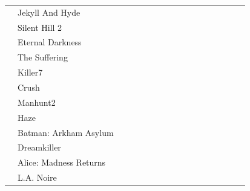 \documentclass[twoside]{urjc-tfg}
\begin{document}
\begin{landscape}
\begin{longtable}{l  l  *{15}{c} }
                      & Jekyll And Hyde		     &      &      &        &       &                      &                   &                   &                   &                   \\
                      & Silent Hill 2		     &      &      &        &       &                      &                   &                   &                   &                   \\
                      & Eternal Darkness	     &      &      &        &       &                      &                   &                   &                   &                   \\
                      & The Suffering		     &      &      &        &       &                      &                   &                   &                   &                   \\
                      & Killer7			     &      &      &        &       &                      &                   &                   &                   &                   \\
                      & Crush			     &      &      &        &       &                      &                   &                   &                   &                   \\
                      & Manhunt2		     &      &      &        &       &                      &                   &                   &                   &                   \\
                      & Haze			     &      &      &        &       &                      &                   &                   &                   &                   \\
                      & Batman: Arkham Asylum	     &      &      &        &       &                      &                   &                   &                   &                   \\
                      & Dreamkiller		     &      &      &        &       &                      &                   &                   &                   &                   \\
                      & Alice: Madness Returns	     &      &      &        &       &                      &                   &                   &                   &                   \\
                      & L.A. Noire	      	     &      &      &        &       &                      &                   &                   &                   &                   \\

\end{longtable}
\end{landscape}
\end{document}
